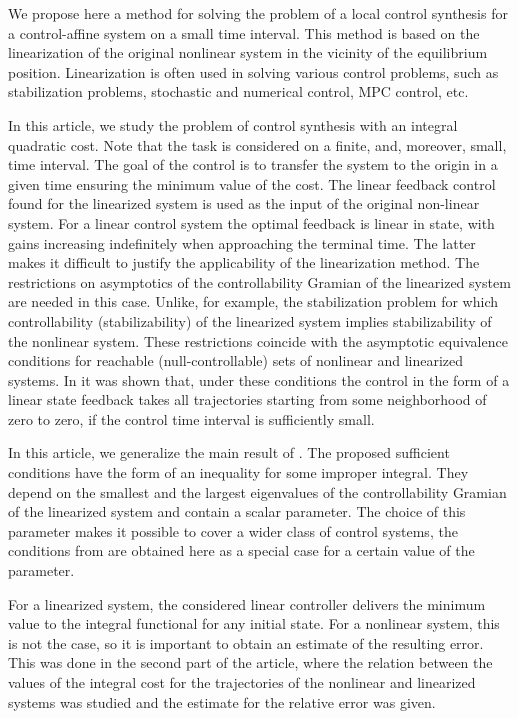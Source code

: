 \documentclass[../main.tex]{subfiles}
\begin{document}
We propose here a method for solving the problem of a local control synthesis  for a control-affine system on a small time interval. This method is based  on the linearization of the original nonlinear system in the vicinity  of the equilibrium position.  Linearization is often used in solving various control problems, such as stabilization problems\cite{Kras,halil}, stochastic and numerical control\cite{Roxin,EKF,denBerg,Pang}, MPC control\cite{Murillo,LTV_MPC}, etc.

In this article, we study the problem of control synthesis with an integral quadratic cost. Note that the task is considered on a finite, and, moreover, small, time interval. The goal of the control is to transfer the system to the origin in a given time ensuring the minimum value of the cost. The linear feedback control found for the linearized system is used as  the input of the original non-linear system. For a linear control system the optimal feedback is linear in state, with gains increasing indefinitely when approaching the terminal time. The latter  makes it difficult to justify the applicability of the linearization method. The restrictions on  asymptotics  of the controllability Gramian of the linearized system are needed in this case. Unlike, for example, the stabilization problem for which controllability (stabilizability) of the linearized system implies stabilizability of the nonlinear system. These restrictions coincide with the  asymptotic equivalence conditions for reachable  (null-controllable) sets of nonlinear and linearized systems. In \cite{GusevOsipov} it was shown that, under these conditions the control in the form of a linear state feedback takes all trajectories starting from some neighborhood of zero to zero, if the control time interval is sufficiently small. 

In this article, we generalize the main result of \cite{GusevOsipov}. The proposed sufficient conditions have the form of an inequality for some improper integral. They depend on the smallest and the largest eigenvalues of the controllability Gramian of the linearized system and contain a scalar parameter. The choice of this parameter makes it possible to cover a wider class of control systems, the conditions from \cite{GusevOsipov} are obtained here as a special case for a certain value of the parameter.

For a linearized system, the considered linear controller delivers the minimum value to the integral functional for any initial state. For a nonlinear system, this is not the case, so it is important to obtain an estimate of the resulting error. This was done in the second part of the article, where  the relation between the values of the integral cost for the trajectories of the nonlinear and linearized systems was studied and  the estimate for the relative error was given. 
\end{document}

